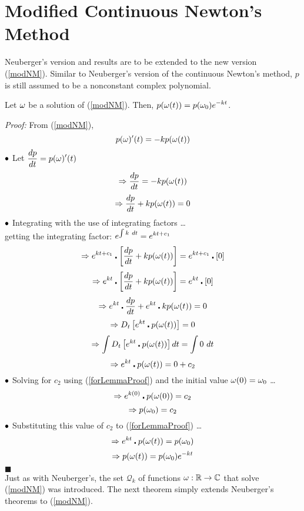 

	\section{Modified Continuous Newton's Method}

Neuberger's version and results are to be extended to the new version (\ref{modNM}). Similar to Neuberger's version of the continuous Newton's method, $p$ is still assumed to be a nonconstant complex polynomial.
\\

\begin{lem}
	Let $\omega$ be a solution of (\ref{modNM}). Then, $p(\omega(t))=p(\omega_0)\displaystyle e^{-kt}$.
\end{lem}

\textit{Proof:}
From (\ref{modNM}),
$$	p(\omega)'(t) = -kp(\omega(t))	$$
$\bullet$ Let $\displaystyle \frac{dp}{dt} = p(\omega)'(t)$
$$\Rightarrow \frac{dp}{dt} = -kp(\omega(t))$$
$$\Rightarrow \frac{dp}{dt} + kp(\omega(t)) = 0$$
$\bullet$ Integrating with the use of integrating factors \dots\\
\phantom{a}\quad\quad\quad getting the integrating factor: $\displaystyle e^{\int k\ dt} = \displaystyle e^{kt+c_1}$
$$\Rightarrow \displaystyle e^{kt+c_1}\centerdot\left[\frac{dp}{dt} + kp(\omega(t))\right] = \displaystyle e^{kt+c_1}\centerdot\left[0\right]$$
$$\Rightarrow \displaystyle e^{kt}\centerdot\left[\frac{dp}{dt} + kp(\omega(t))\right] = \displaystyle e^{kt}\centerdot\left[0\right]$$
$$\Rightarrow \displaystyle e^{kt}\centerdot\frac{dp}{dt} + e^{kt}\centerdot kp(\omega(t)) = 0$$
$$\Rightarrow \displaystyle D_t\left[e^{kt}\centerdot p(\omega(t))\right] = 0$$
$$\Rightarrow \displaystyle \int D_t\left[e^{kt}\centerdot p(\omega(t))\right]dt = \displaystyle\int0\ dt$$
\begin{equation}\label{forLemmaProof}
	\Rightarrow \displaystyle e^{kt}\centerdot p(\omega(t)) = 0 + c_2
\end{equation}
$\bullet$ Solving for $c_2$ using (\ref{forLemmaProof}) and the initial value $\omega(0) = \omega_0$ \dots
$$\Rightarrow \displaystyle e^{k(0)}\centerdot p(\omega(0)) = c_2$$
$$\Rightarrow p(\omega_0) = c_2$$
$\bullet$ Substituting this value of $c_2$ to (\ref{forLemmaProof}) \dots
$$\Rightarrow \displaystyle e^{kt}\centerdot p(\omega(t)) = p(\omega_0)$$
$$\Rightarrow p(\omega(t)) = p(\omega_0)\displaystyle e^{-kt}$$
\phantom{a}\hfill$\blacksquare$\\

Just as with Neuberger's, the set $\mathcal{Q}_k$ of functions $\omega:\mathbb{R}\rightarrow\mathbb{C}$ that solve (\ref{modNM}) was introduced. The next theorem simply extends Neuberger's theorems to (\ref{modNM}).

